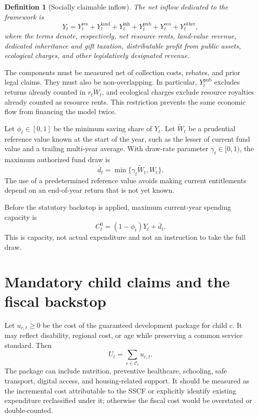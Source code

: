\documentclass[11pt]{article}
\newtheorem{definition}{Definition}[section]
\begin{document}
\begin{definition}[Socially claimable inflow]
The net inflow dedicated to the framework is
\begin{equation}
  Y_t=Y_t^{\mathrm{res}}+Y_t^{\mathrm{land}}+Y_t^{\mathrm{inh}}
      +Y_t^{\mathrm{pub}}+Y_t^{\mathrm{eco}}+Y_t^{\mathrm{other}},
\end{equation}
where the terms denote, respectively, net resource rents, land-value revenue, dedicated
inheritance and gift taxation, distributable profit from public assets, ecological
charges, and other legislatively designated revenue.
\end{definition}

The components must be measured net of collection costs, rebates, and prior legal
claims. They must also be non-overlapping. In particular, $Y_t^{\mathrm{pub}}$ excludes
returns already counted in $r_tW_t$, and ecological charges exclude resource royalties
already counted as resource rents. This restriction prevents the same economic flow
from financing the model twice.

Let $\phi_t\in[0,1]$ be the minimum saving share of $Y_t$. Let $\widetilde W_t$ be a
prudential reference value known at the start of the year, such as the lesser of current
fund value and a trailing multi-year average. With draw-rate parameter
$\gamma_t\in[0,1)$, the maximum authorized fund draw is
\begin{equation}
  \overline d_t=\min\{\gamma_t\widetilde W_t,W_t\}.
\end{equation}
The use of a predetermined reference value avoids making current entitlements depend on
an end-of-year return that is not yet known.

Before the statutory backstop is applied, maximum current-year spending capacity is
\begin{equation}
  C_t^0=(1-\phi_t)Y_t+\overline d_t.
\end{equation}
This is capacity, not actual expenditure and not an instruction to take the full draw.

\section{Mandatory child claims and the fiscal backstop}

Let $u_{c,t}\ge0$ be the cost of the guaranteed development package for child $c$. It
may reflect disability, regional cost, or age while preserving a common service
standard. Then
\begin{equation}
  U_t=\sum_{c\in\mathcal C_t}u_{c,t}.
\end{equation}
The package can include nutrition, preventive healthcare, schooling, safe transport,
digital access, and housing-related support. It should be measured as the incremental
cost attributable to the SSCF or explicitly identify existing expenditure reclassified
under it; otherwise the fiscal cost would be overstated or double-counted.
\end{document}
